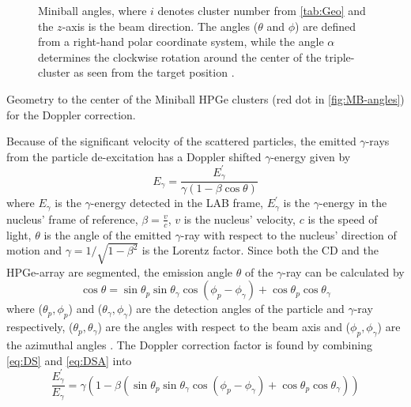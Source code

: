 \documentclass[twoside,english]{uiofysmaster/uiofysmaster}
\newcommand{\ga}{$\gamma$}
\begin{document}
\begin{figure}[ht]
	\centering
	
	\caption{Miniball angles, where $i$ denotes cluster number from \autoref{tab:Geo} and the $z$-axis is the beam direction. The angles ($\theta$ and $\phi$) are defined from a right-hand polar coordinate system, while the angle $\alpha$ determines the clockwise rotation around the center of the triple-cluster as seen from the target position \cite{NWarr-Angles}.}
	\label{fig:MB-angles}
\end{figure}


\begin{table}[ht] 
	\centering 
	\caption{Geometry to the center of the Miniball HPGe clusters (red dot in \autoref{fig:MB-angles}) for the Doppler correction.}
	
	\label{tab:Geo}
\end{table}




Because of the significant velocity of the scattered particles, the emitted \ga-rays from the particle de-excitation has a Doppler shifted \ga-energy given by 
\begin{equation}\label{eq:DS}
	E_\gamma = \frac{E_\gamma^{'}}{\gamma (1 - \beta \cos \theta)}
\end{equation}
where $E_\gamma$ is the \ga-energy detected in the LAB frame, $E_\gamma^{'}$ is the \ga-energy in the nucleus' frame of reference, $\beta = \frac{v}{c}$, $v$ is the nucleus' velocity, $c$ is the speed of light, $\theta$ is the angle of the emitted \ga-ray with respect to the nucleus' direction of motion and $\gamma = 1/\sqrt{1 - \beta^2}$ is the Lorentz factor. Since both the CD and the HPGe-array are segmented, the emission angle $\theta$ of the \ga-ray can be calculated by 
\begin{equation}\label{eq:DSA}
	\cos \theta = \sin \theta_p \sin \theta_\gamma \cos (\phi_p - \phi_\gamma) + \cos \theta_p \cos \theta_\gamma
\end{equation}
where ($\theta_p, \phi_p$) and ($\theta_\gamma, \phi_\gamma$) are the detection angles of the particle and \ga-ray respectively, ($\theta_p, \theta_\gamma$) are the angles with respect to the beam axis and ($\phi_p, \phi_\gamma$) are the azimuthal angles \cite{RIBF2012, MB-spect}. The Doppler correction factor is found by combining \autoref{eq:DS} and \autoref{eq:DSA} into
\begin{equation}
	\frac{E_\gamma^{'}}{E_\gamma} = \gamma (1 - \beta (\sin \theta_p \sin \theta_\gamma \cos (\phi_p - \phi_\gamma) + \cos \theta_p \cos \theta_\gamma))
\end{equation}
\end{document}
